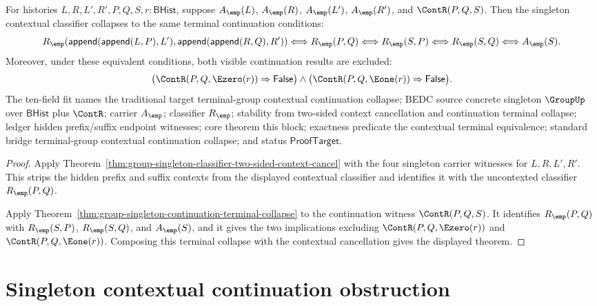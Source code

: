 \begin{theorem}
\label{thm:group-singleton-contextual-continuation-terminal-collapse}
For histories $L,R,L',R',P,Q,S,r:\mathsf{BHist}$, suppose $A_{\emp}(L)$,
$A_{\emp}(R)$, $A_{\emp}(L')$, $A_{\emp}(R')$, and $\ContR(P,Q,S)$.
Then the singleton contextual classifier collapses to the same terminal
continuation conditions:
$$
R_{\emp}(\mathsf{append}(\mathsf{append}(L,P),L'),
\mathsf{append}(\mathsf{append}(R,Q),R'))
\Longleftrightarrow
R_{\emp}(P,Q)
\Longleftrightarrow
R_{\emp}(S,P)
\Longleftrightarrow
R_{\emp}(S,Q)
\Longleftrightarrow
A_{\emp}(S).
$$
Moreover, under these equivalent conditions, both visible continuation results
are excluded:
$$
\bigl(\ContR(P,Q,\Ezero(r))\Rightarrow\mathsf{False}\bigr)\land
\bigl(\ContR(P,Q,\Eone(r))\Rightarrow\mathsf{False}\bigr).
$$
The ten-field fit names the traditional target terminal-group contextual
continuation collapse; BEDC source concrete singleton $\GroupUp$ over
$\mathsf{BHist}$ plus $\ContR$; carrier $A_{\emp}$; classifier $R_{\emp}$;
stability from two-sided context cancellation and continuation terminal
collapse; ledger hidden prefix/suffix endpoint witnesses; core theorem this
block; exactness predicate the contextual terminal equivalence; standard bridge
terminal-group contextual continuation collapse; and status
$\mathsf{ProofTarget}$.
\end{theorem}
\begin{proof}
Apply Theorem~\ref{thm:group-singleton-classifier-two-sided-context-cancel}
with the four singleton carrier witnesses for $L,R,L',R'$. This strips the
hidden prefix and suffix contexts from the displayed contextual classifier and
identifies it with the uncontexted classifier $R_{\emp}(P,Q)$.

Apply Theorem~\ref{thm:group-singleton-continuation-terminal-collapse} to the
continuation witness $\ContR(P,Q,S)$. It identifies $R_{\emp}(P,Q)$ with
$R_{\emp}(S,P)$, $R_{\emp}(S,Q)$, and $A_{\emp}(S)$, and it gives the two
implications excluding $\ContR(P,Q,\Ezero(r))$ and
$\ContR(P,Q,\Eone(r))$. Composing this terminal collapse with the contextual
cancellation gives the displayed theorem.
\end{proof}

\section{Singleton contextual continuation obstruction}
\label{sec:group-singleton-contextual-continuation-obstruction}

